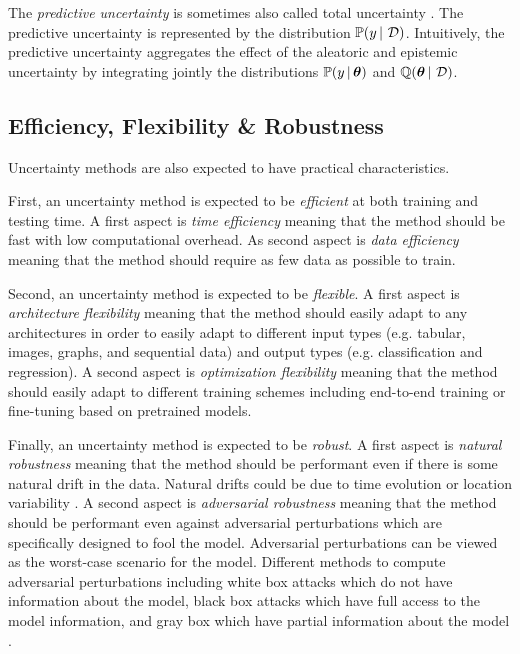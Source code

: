 The \emph{predictive uncertainty} is sometimes also called total uncertainty \cite{hullermeier2021aleatoric,malini2018}.
The predictive uncertainty is represented by the distribution $\mathbb{P}(y \,|\, \operatorname{\mathcal{D}})$.
Intuitively, the predictive uncertainty aggregates the effect of the aleatoric and epistemic uncertainty by integrating jointly the distributions $\mathbb{P}(y \,|\, \bm{\theta})$ and $\operatorname{\mathbb{Q}}(\bm{\theta} \,|\, \operatorname{\mathcal{D}})$.

\subsection{Efficiency, Flexibility \& Robustness}

Uncertainty methods are also expected to have practical characteristics. 

First, an uncertainty method is expected to be \emph{efficient} at both training and testing time. 
A first aspect is \emph{time efficiency} meaning that the method should be fast with low computational overhead.
As second aspect is \emph{data efficiency} meaning that the method should require as few data as possible to train.

Second, an uncertainty method is expected to be \emph{flexible}.
A first aspect is \emph{architecture flexibility} meaning that the method should easily adapt to any architectures in order to easily adapt to different input types (e.g. tabular, images, graphs, and sequential data) and output types (e.g. classification and regression).
A second aspect is \emph{optimization flexibility} meaning that the method should easily adapt to different training schemes including end-to-end training or fine-tuning based on pretrained models.

Finally, an uncertainty method is expected to be \emph{robust}.
A first aspect is \emph{natural robustness} meaning that the method should be performant even if there is some natural drift in the data. Natural drifts could be due to time evolution or location variability \cite{shifts-dataset}.
A second aspect is \emph{adversarial robustness} meaning that the method should be performant even against adversarial perturbations which are specifically designed to fool the model. Adversarial perturbations can be viewed as the worst-case scenario for the model. Different methods to compute adversarial perturbations including white box attacks which do not have information about the model, black box attacks which have full access to the model information, and gray box which have partial information about the model \cite{han2020adversarial}.

